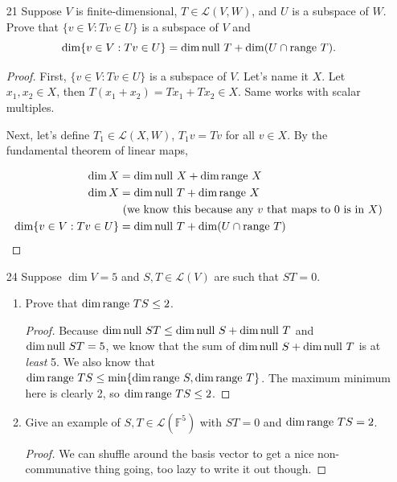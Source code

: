 \begin{enumerate}
\begin{proof}
        Suppose that $T$ is injective. Suppose $V$ has basis vectors $v_1, \dots, v_n$ and $W$ has basis vectors $w_1, \dots, w_n$ for some subspace of $W$ (we know that $\dim V = \dim W$ because otherwise we would not have an injection). Also, $Tv_i = w_i$ (if it did not map to the basis, it would not be injective, proof is trivial but you use range for it). Then we could also define $Sw_i = v_i$, which is a linear map (trivially), and we are done.

    \end{proof}

    \item[21] Suppose $V$ is finite-dimensional, $T \in \mathcal L(V, W)$, and $U$ is a subspace of $W$.
Prove that $\{v \in V : Tv \in U\}$ is a subspace of $V$ and
\[
    \dim\{v \in V : Tv \in U\} = \dim \text{null } T + \dim(U \cap \text{range } T).
\]

    \begin{proof}
        First,  $\{v \in V : Tv \in U\}$ is a subspace of $V$. Let's name it $X$. Let $x_1, x_2 \in X$, then $T(x_1 + x_2) = Tx_1 + Tx_2 \in X$. Same works with scalar multiples. 

        Next, let's define $T_1 \in \mathcal L(X, W)$, $T_1v = Tv$ for all $v \in X$. By the fundamental theorem of linear maps, 

        \begin{align*}
            \dim X &= \dim \text{null } X + \dim \text{range } X \\
            \dim X &= \dim \text{null } T + \dim \text{range } X \\
            &\text{ (we know this because any $v$ that maps to 0 is in $X$)} \\
            \dim \{v \in V : Tv \in U\} &= \dim \text{null } T + \dim(U \cap \text{range } T)
        \end{align*}
    \end{proof}


    \item[24] Suppose $\dim V = 5$ and $S, T \in \mathcal{L}(V)$ are such that $ST = 0$.
    \begin{enumerate}
        \item Prove that $\dim \text{range } TS \leq 2$.
        \begin{proof}
            Because $\dim \text{null } ST \leq \dim \text{null } S + \dim \text{null } T$ and $\dim \text{null } ST = 5$, we know that the sum of $\dim \text{null } S + \dim \text{null } T$ is at \emph{least} 5. We also know that $\dim \text{range } TS \leq \min\{\dim \text{range } S, \dim \text{range } T\}$. The maximum minimum here is clearly 2, so $\dim \text{range } TS \leq 2$.
        \end{proof}
        \item Give an example of $S, T \in \mathcal{L}(\mathbb{F}^5)$ with $ST = 0$ and $\dim \text{range } TS = 2$.
        \begin{proof}
            We can shuffle around the basis vector to get a nice non-communative thing going, too lazy to write it out though.
        \end{proof}
    \end{enumerate}



\end{enumerate}
